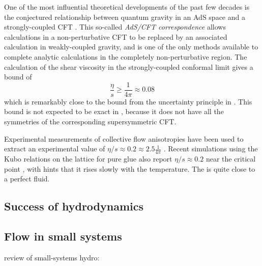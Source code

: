 One of the most influential theoretical developments of the past few decades is the conjectured relationship between quantum gravity in an \ac{AdS} space and a strongly-coupled \ac{CFT} \cite{Maldacena:1997re}.
This so-called \emph{\ac{AdS}/\ac{CFT} correspondence} allows calculations in a non-perturbative \ac{CFT} to be replaced by an associated calculation in weakly-coupled gravity, and is one of the only methods available to complete analytic calculations in the completely non-perturbative region.
The calculation of the shear viscosity in the strongly-coupled conformal limit gives a bound of \cite{Kovtun:2004de}
\begin{equation}
  \frac{\eta}{s} \geq \frac{1}{4\pi} \approx 0.08
\end{equation}
which is remarkably close to the bound from the uncertainty principle in .
This bound is not expected to be exact in \qcd, because it does not have all the symmetries of the corresponding supersymmetric \ac{CFT}.

Experimental measurements of collective flow anisotropies have been used to extract an experimental value of $\eta/s \approx 0.2 \approx 2.5\frac{1}{4\pi}$ \cite{Heinz:2013th}.
Recent simulations using the Kubo relations on the lattice for pure glue also report $\eta/s \approx 0.2$ near the critical point \cite{Astrakhantsev:2017nrs}, with hints that it rises slowly with the temperature.
The \qgp is quite close to a perfect fluid.

\subsection{Success of hydrodynamics}

\subsection{Flow in small systems}
 review of small-systems hydro: \cite{Nagle:2018nvi}

